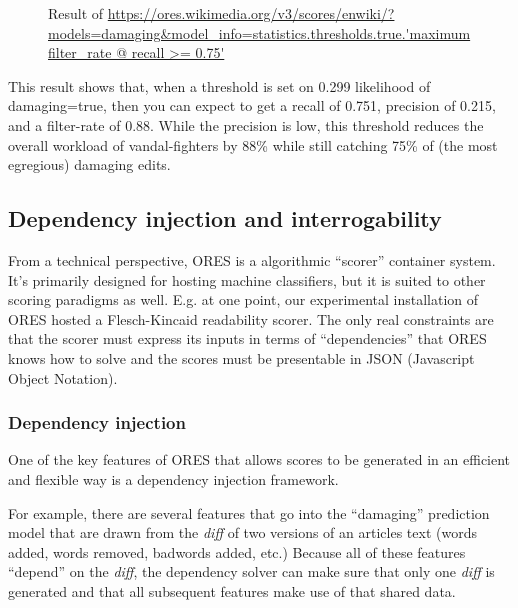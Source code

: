 \begin{figure}[htbp]
        \caption{Result of \url{https://ores.wikimedia.org/v3/scores/enwiki/?models=damaging&model_info=statistics.thresholds.true.'maximum filter_rate @ recall >= 0.75'}}
        \label{fig:english_damaging_threshold_optimization}
\end{figure}

This result shows that, when a threshold is set on 0.299 likelihood of damaging=true, then you can expect to get a recall of 0.751, precision of 0.215, and a filter-rate of 0.88.  While the precision is low, this threshold reduces the overall workload of vandal-fighters by 88\% while still catching 75\% of (the most egregious) damaging edits.

\subsection{Dependency injection and interrogability}
From a technical perspective, ORES is a algorithmic ``scorer'' container system.  It's primarily designed for hosting machine classifiers, but it is suited to other scoring paradigms as well.  E.g. at one point, our experimental installation of ORES hosted a Flesch-Kincaid readability scorer.  The only real constraints are that the scorer must express its inputs in terms of ``dependencies'' that ORES knows how to solve and the scores must be presentable in JSON (Javascript Object Notation).

\subsubsection{Dependency injection}
One of the key features of ORES that allows scores to be generated in an efficient and flexible way is a dependency injection framework.

For example, there are several features that go into the ``damaging'' prediction model that are drawn from the \emph{diff} of two versions of an articles text (words added, words removed, badwords added, etc.)  Because all of these features ``depend'' on the \emph{diff}, the dependency solver can make sure that only one \emph{diff} is generated and that all subsequent features make use of that shared data.

